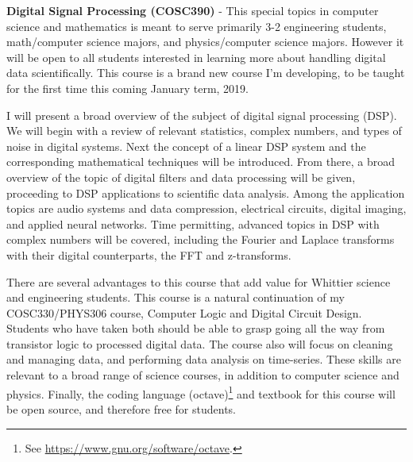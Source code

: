 \documentclass[../../main.tex]{subfiles}
\begin{document}
\textbf{Digital Signal Processing (COSC390)} - This special topics in computer science and mathematics is meant to serve primarily 3-2 engineering students, math/computer science majors, and physics/computer science majors.  However it will be open to all students interested in learning more about handling digital data scientifically.  This course is a brand new course I'm developing, to be taught for the first time this coming January term, 2019. \\ \hspace{0.1cm}

I will present a broad overview of the subject of digital signal processing (DSP).  We will begin with a review of relevant statistics, complex numbers, and types of noise in digital systems. Next the concept of a linear DSP system and the corresponding mathematical techniques will be introduced. From there, a broad overview of the topic of digital filters and data processing will be given, proceeding to DSP applications to scientific data analysis. Among the application topics are audio systems and data compression, electrical circuits, digital imaging, and applied neural networks. Time permitting, advanced topics in DSP with complex numbers will be covered, including the Fourier and Laplace transforms with their digital counterparts, the FFT and z-transforms. \\ \hspace{0.1cm}

There are several advantages to this course that add value for Whittier science and engineering students.  This course is a natural continuation of my COSC330/PHYS306 course, Computer Logic and Digital Circuit Design.  Students who have taken both should be able to grasp going all the way from transistor logic to processed digital data.  The course also will focus on cleaning and managing data, and performing data analysis on time-series.  These skills are relevant to a broad range of science courses, in addition to computer science and physics.  Finally, the coding language (octave)\footnote{See \url{https://www.gnu.org/software/octave}.} and textbook \cite{dsp} for this course will be open source, and therefore free for students. \\ \hspace{0.1cm}
\end{document}
